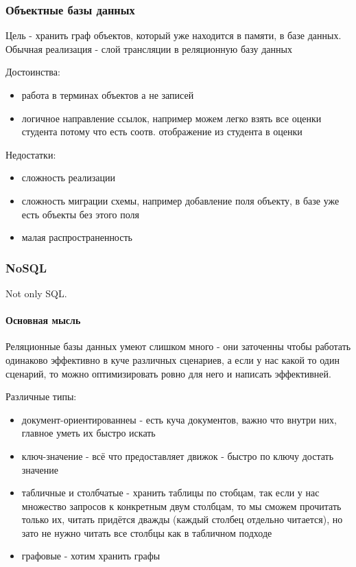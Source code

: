 \subsubsection{Объектные базы данных}
Цель - хранить граф объектов, который уже находится в памяти, в базе данных. Обычная реализация - слой трансляции в реляционную базу данных

\enewline

Достоинства:
\begin{itemize}
	\item работа в терминах объектов а не записей
	\item логичное направление ссылок, например можем легко взять все оценки студента потому что есть соотв. отображение из студента в оценки
\end{itemize}

Недостатки:
\begin{itemize}
	\item сложность реализации
	\item сложность миграции схемы, например добавление поля объекту, в базе уже есть объекты без этого поля
	\item малая распространенность
\end{itemize}

\subsubsection{NoSQL}
Not only SQL. \\ \paragraph{Основная мысль} Реляционные базы данных умеют слишком много - они заточенны чтобы работать одинаково эффективно в куче различных сценариев, а если у нас какой то один сценарий, то можно оптимизировать ровно для него и написать эффективней.

\enewline

Различные типы:
\begin{itemize}
	\item документ-ориентированнеы - есть куча документов, важно что внутри них, главное уметь их быстро искать
	\item ключ-значение - всё что предоставляет движок - быстро по ключу достать значение
	\item табличные и столбчатые - хранить таблицы по стобцам, так если у нас множество запросов к конкретным двум столбцам, то мы сможем прочитать только их, читать придётся дважды (каждый столбец отдельно читается), но зато не нужно читать все столбцы как в табличном подходе
	\item графовые - хотим хранить графы
\end{itemize}

